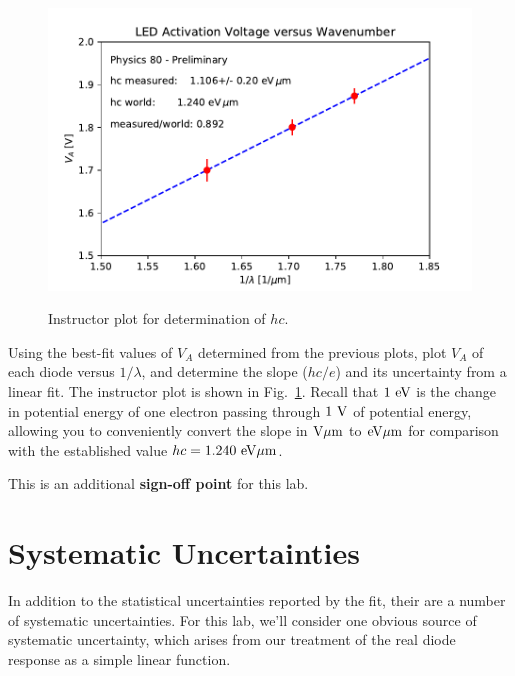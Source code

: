 \begin{figure}[htbp]
\begin{center}
\includegraphics[height=0.3\textheight]{figs/labs/planck/planck.pdf} \\
\end{center}
\caption{Instructor plot for determination of $hc$.}
\label{fig:planckfit}
\end{figure}

\begin{plot}
Using the best-fit values of $V_A$ determined from the previous plots,
plot $V_A$ of each diode versus $1/\lambda$, and determine the slope
($hc/e$) and its uncertainty from a linear fit.  The instructor plot
is shown in Fig.~\ref{fig:planckfit}.  Recall that $1~\rm eV$ is the
change in potential energy of one electron passing through $1~\rm V$
of potential energy, allowing you to conveniently convert the slope in
$\rm V \mu m$ to $\rm eV \mu m$ for comparison with the established
value $hc = 1.240~\rm eV \mu m$.
\end{plot}

This is an additional \textbf{sign-off point} for this lab. 

\section{Systematic Uncertainties}

In addition to the statistical uncertainties reported by the fit,
their are a number of systematic uncertainties.  For this lab, we'll
consider one obvious source of systematic uncertainty, which arises
from our treatment of the real diode response as a simple linear
function.

